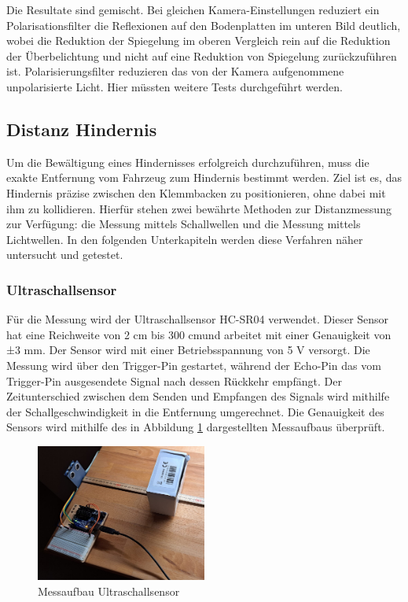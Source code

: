 \documentclass[../main.tex]{subfiles}
\begin{document}
Die Resultate sind gemischt. Bei gleichen Kamera-Einstellungen reduziert ein Polarisationsfilter die Reflexionen auf den Bodenplatten im unteren Bild deutlich, wobei die Reduktion der Spiegelung im oberen Vergleich rein auf die Reduktion der Überbelichtung und nicht auf eine Reduktion von Spiegelung zurückzuführen ist. Polarisierungsfilter reduzieren das von der Kamera aufgenommene unpolarisierte Licht. Hier müssten weitere Tests durchgeführt werden.
\newpage
\subsection{Distanz Hindernis} 
\label{sec:Distanz_Hindernis}
Um die Bewältigung eines Hindernisses erfolgreich durchzuführen, muss die exakte Entfernung vom Fahrzeug zum Hindernis bestimmt werden. Ziel ist es, das Hindernis präzise zwischen den Klemmbacken zu positionieren, ohne dabei mit ihm zu kollidieren. Hierfür stehen zwei bewährte Methoden zur Distanzmessung zur Verfügung: die Messung mittels Schallwellen und die Messung mittels Lichtwellen. In den folgenden Unterkapiteln werden diese Verfahren näher untersucht und getestet.

\subsubsection{Ultraschallsensor}
Für die Messung wird der Ultraschallsensor HC-SR04 verwendet. Dieser Sensor hat eine Reichweite von 2 cm bis 300 cm\footnotemark und arbeitet mit einer Genauigkeit von ±3 mm. Der Sensor wird mit einer Betriebsspannung von 5 V versorgt. Die Messung wird über den Trigger-Pin gestartet, während der Echo-Pin das vom Trigger-Pin ausgesendete Signal nach dessen Rückkehr empfängt. Der Zeitunterschied zwischen dem Senden und Empfangen des Signals wird mithilfe der Schallgeschwindigkeit in die Entfernung umgerechnet. Die Genauigkeit des Sensors wird mithilfe des in Abbildung \ref{fig:Ultraschall1} dargestellten Messaufbaus überprüft.

\begin{figure}[h] %
    \centering
    \includegraphics[width=0.5\textwidth]{img/sensortest/MA_Ultraschall.jpg} %
    \caption{Messaufbau Ultraschallsensor}
    \label{fig:Ultraschall1} %
\end{figure}
\end{document}
